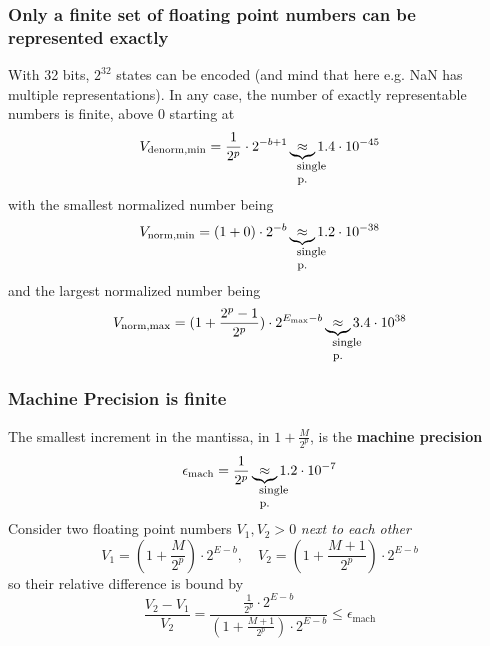 \subsubsection{Only a finite set of floating point numbers can be represented exactly}
With 32 bits, $2^{32}$ states can be encoded (and mind that here e.g. NaN has multiple representations). In any case,
the number of exactly representable numbers is finite, above $0$ starting at
\begin{equation}
    V_{\text{denorm,min}} = \frac{1}{2^p} \cdot 2^{-b+1} \explain{\approx}{single p.} 1.4 \cdot 10^{-45}
\end{equation}
with the smallest normalized number being
\begin{equation}
    V_{\text{norm,min}} = (1 + 0) \cdot 2^{-b} \explain{\approx}{single p.} 1.2 \cdot 10^{-38}
\end{equation}
and the largest normalized number being
\begin{equation}
    V_{\text{norm,max}} = (1 + \frac{2^p - 1}{2^p}) \cdot 2^{E_{\text{max}} - b} \explain{\approx}{single p.} 3.4 \cdot 10^{38}
\end{equation}

\subsubsection{Machine Precision is finite}
The smallest increment in the mantissa, in $1 + \frac{M}{2^p}$, is the \textbf{machine precision}
\begin{equation}
    \epsilon_{\text{mach}} = \frac{1}{2^p} \explain{\approx}{single p.} 1.2 \cdot 10^{-7}
\end{equation}
Consider two floating point numbers $V_1,V_2>0$ \textit{next to each other}
\begin{equation}
    V_1 = \left(1 + \frac{M}{2^p}\right) \cdot 2^{E - b}, \quad V_2 = \left(1 + \frac{M + 1}{2^p}\right) \cdot 2^{E - b}
\end{equation}
so their relative difference is bound by
\begin{equation}
    \frac{V_2 - V_1}{V_2} = \frac{\frac{1}{2^p} \cdot 2^{E - b}}{\left(1 + \frac{M + 1}{2^p}\right) \cdot 2^{E - b}} \leq \epsilon_{\text{mach}}
\end{equation}


